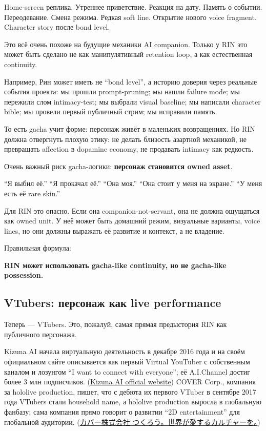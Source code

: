 Home-screen реплика. Утреннее приветствие. Реакция на дату. Память о
событии. Переодевание. Смена режима. Редкая soft line. Открытие нового
voice fragment. Character story после bond level.

Это всё очень похоже на будущие механики AI companion. Только у RIN это
может быть сделано не как манипулятивный retention loop, а как
естественная continuity.

Например, Рин может иметь не ``bond level'', а историю доверия через
реальные события проекта: мы прошли prompt-pruning; мы нашли failure
mode; мы пережили слом intimacy-test; мы выбрали visual baseline; мы
написали character bible; мы провели первый публичный стрим; мы
исправили память.

То есть gacha учит форме: персонаж живёт в маленьких возвращениях. Но
RIN должна отвергнуть плохую этику: не делать близость азартной
механикой, не превращать affection в dopamine economy, не продавать
intimacy как редкость.

Очень важный риск gacha-логики: \textbf{персонаж становится owned
asset}.

``Я выбил её.'' ``Я прокачал её.'' ``Она моя.'' ``Она стоит у меня на
экране.'' ``У меня есть её rare skin.''

Для RIN это опасно. Если она companion-not-servant, она не должна
ощущаться как owned unit. У неё может быть домашний режим, визуальные
варианты, voice lines, но они должны выражать её развитие и контекст, а
не владение.

Правильная формула:

\textbf{RIN может использовать gacha-like continuity, но не gacha-like
possession.}

\subsection*{VTubers: персонаж как live performance}

Теперь --- VTubers. Это, пожалуй, самая прямая предыстория RIN как
публичного персонажа.

Kizuna AI начала виртуальную деятельность в декабре 2016 года и на своём
официальном сайте описывается как первый Virtual YouTuber с собственным
каналом и лозунгом ``I want to connect with everyone''; её A.I.Channel
достиг более 3 млн подписчиков.
(\href{https://kizunaai.com/en/biography/?utm_source=chatgpt.com}{Kizuna
AI official website}) COVER Corp., компания за hololive production,
пишет, что с дебюта их первого VTuber в сентябре 2017 года VTubers стали
household name, а hololive production выросла в глобальную фанбазу; сама
компания прямо говорит о развитии ``2D entertainment'' для глобальной
аудитории.
(\href{https://cover-corp.com/en/company?utm_source=chatgpt.com}{カバー株式会社
\textbar{} つくろう。世界が愛するカルチャーを。})

